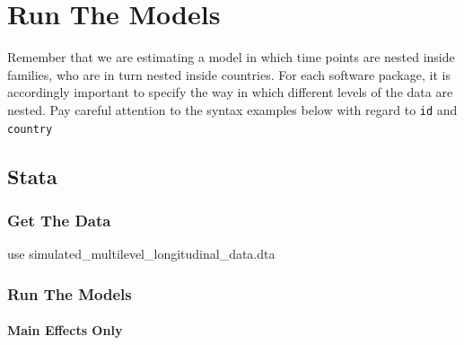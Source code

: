 \documentclass[
  letterpaper,
  DIV=11,
  numbers=noendperiod]{scrreprt}
\let\oldparagraph\paragraph
\renewcommand{\paragraph}[1]{\oldparagraph{#1}\mbox{}}
\newenvironment{Shaded}{\begin{snugshade}}{\end{snugshade}}
\newcommand{\KeywordTok}[1]{\textcolor[rgb]{0.00,0.23,0.31}{#1}}
\newcommand{\NormalTok}[1]{\textcolor[rgb]{0.00,0.23,0.31}{#1}}
\begin{document}
\section{Run The Models}\label{run-the-models-1}

\begin{tcolorbox}[enhanced jigsaw, rightrule=.15mm, arc=.35mm, colframe=quarto-callout-warning-color-frame, title=\textcolor{quarto-callout-warning-color}{\faExclamationTriangle}\hspace{0.5em}{Warning}, bottomrule=.15mm, colback=white, colbacktitle=quarto-callout-warning-color!10!white, toptitle=1mm, left=2mm, titlerule=0mm, leftrule=.75mm, toprule=.15mm, opacitybacktitle=0.6, bottomtitle=1mm, coltitle=black, breakable, opacityback=0]

Remember that we are estimating a model in which time points are nested
inside families, who are in turn nested inside countries. For each
software package, it is accordingly important to specify the way in
which different levels of the data are nested. Pay careful attention to
the syntax examples below with regard to \texttt{id} and
\texttt{country}

\end{tcolorbox}

\subsection{Stata}

\subsubsection{Get The Data}\label{get-the-data-3}

\begin{Shaded}
\begin{Highlighting}[]

\KeywordTok{use}\NormalTok{ simulated\_multilevel\_longitudinal\_data.dta}
\end{Highlighting}
\end{Shaded}

\subsubsection{Run The Models}\label{run-the-models-2}

\paragraph{Main Effects Only}\label{main-effects-only}
\end{document}
